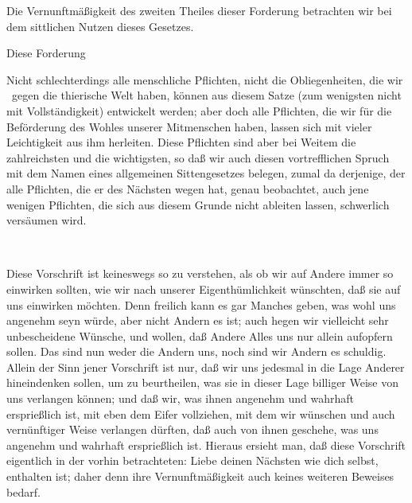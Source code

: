 \begin{aufza}
\begin{aufzb}
Die Vernunftmäßigkeit des zweiten Theiles dieser Forderung betrachten wir bei dem sittlichen Nutzen dieses Gesetzes.
\item Diese Forderung \par
Nicht schlechterdings alle menschliche Pflichten, nicht die Obliegenheiten, die wir \zB\  gegen die thierische Welt haben, können aus diesem Satze (zum wenigsten nicht mit Vollständigkeit) entwickelt werden; aber doch alle Pflichten, die wir für die Beförderung des Wohles unserer Mitmenschen haben, lassen sich mit vieler Leichtigkeit aus ihm herleiten. Diese Pflichten sind aber bei Weitem die zahlreichsten und die wichtigsten, so daß wir auch diesen vortrefflichen Spruch mit dem Namen eines allgemeinen Sittengesetzes belegen, zumal da derjenige, der alle Pflichten, die er des Nächsten wegen hat, genau beobachtet, auch jene wenigen Pflichten, die sich aus diesem Grunde nicht ableiten lassen, schwerlich versäumen wird.
\end{aufzb}
\item {}~\par
Diese Vorschrift ist keineswegs so zu verstehen, als ob wir auf Andere immer so einwirken sollten, wie wir nach unserer Eigenthümlichkeit wünschten, daß sie auf uns einwirken möchten. Denn freilich kann es gar Manches geben, was wohl uns angenehm seyn würde, aber nicht Andern es ist; auch hegen wir vielleicht sehr unbescheidene Wünsche, und wollen, daß Andere Alles uns nur allein aufopfern sollen. Das sind nun weder die Andern uns, noch sind wir Andern es schuldig. Allein der Sinn jener Vorschrift ist nur, daß wir uns jedesmal in die Lage Anderer hineindenken sollen, um zu beurtheilen, was sie in dieser Lage billiger Weise von uns verlangen können; und daß wir, was ihnen angenehm und wahrhaft ersprießlich ist, mit eben dem Eifer vollziehen, mit dem wir wünschen und auch vernünftiger Weise verlangen dürften, daß auch von ihnen geschehe, was uns angenehm und wahrhaft ersprießlich ist. Hieraus ersieht man, daß diese Vorschrift eigentlich in der vorhin betrachteten: Liebe deinen Nächsten wie dich selbst, enthalten ist; daher denn ihre Vernunftmäßigkeit auch keines weiteren Beweises bedarf.
\end{aufza}

